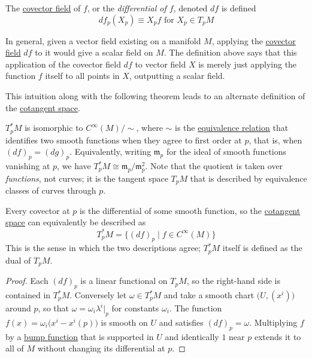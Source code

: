 \documentclass{article}
\newcounter{theorem}[section]
\newcounter{definition}[section]
\begin{document}
    \begin{definition}[Differential of $f$]
      \label{def:differential-of-f}
    The \hyperref[def:covector-field]{covector field} of $f$, or the \textit{differential of $f$}, denoted $df$ is defined
    \begin{equation}
      df_p (X_p) \equiv X_p f \text{ for } X_p \in T_p M
    \end{equation}
    \end{definition}

    In general, given a vector field existing on a manifold $M$, applying the \hyperref[def:covector-field]{covector field} $df$ to it would give a scalar field on $M$. The definition above says that this application of the covector field $df$ to vector field $X$ is merely just applying the function $f$ itself to all points in $X$, outputting a scalar field. 

    This intuition along with the following theorem leads to an alternate definition of the \hyperref[def:cotangent-space]{cotangent space}. 

    \begin{theorem}
      \label{thm:cotangent-space-as-a-quotient-of-cinftym}
    $T_p^* M$ is isomorphic to $C^\infty(M) / \sim$, where $\sim$ is the \hyperref[st-def:equivalence_relation]{equivalence relation} that identifies two smooth functions when they agree to first order at $p$, that is, when $(df)_p = (dg)_p$. Equivalently, writing $\mathfrak{m}_p$ for the ideal of smooth functions vanishing at $p$, we have $T_p^* M \cong \mathfrak{m}_p / \mathfrak{m}_p^2$. Note that the quotient is taken over \textit{functions}, not curves; it is the tangent space $T_p M$ that is described by equivalence classes of curves through $p$. 
    \end{theorem}

    \begin{theorem}
      \label{thm:differentials-span-the-cotangent-space}
    Every covector at $p$ is the differential of some smooth function, so the \hyperref[def:cotangent-space]{cotangent space} can equivalently be described as 
    \begin{equation}
      T_p^* M = \{ (d f)_{p} \; | \; f \in C^{\infty} (M) \}
    \end{equation}
    This is the sense in which the two descriptions agree; $T_p^* M$ itself is defined as the dual of $T_p M$. 
    \end{theorem}
    \begin{proof}
    Each $(df)_p$ is a linear functional on $T_p M$, so the right-hand side is contained in $T_p^* M$. Conversely let $\omega \in T_p^* M$ and take a smooth chart $\big(U, (x^i)\big)$ around $p$, so that $\omega = \omega_i \lambda^i \big|_p$ for constants $\omega_i$. The function $f(x) = \omega_i \big( x^i - x^i(p) \big)$ is smooth on $U$ and satisfies $(df)_p = \omega$. Multiplying $f$ by a \hyperref[thm:smooth-bump-function-on-rn]{bump function} that is supported in $U$ and identically $1$ near $p$ extends it to all of $M$ without changing its differential at $p$. 
    \end{proof}
\end{document}
